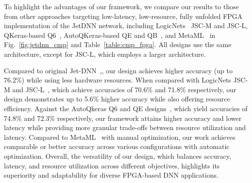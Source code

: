 
 
To highlight the advantages of our framework, we compare our results to those from other approaches targeting low-latency, low-resource, fully unfolded FPGA implementation of the JetDNN network, including LogicNets~\cite{umuroglu2020logicnets} JSC-M and JSC-L, QKeras-based Q6~\cite{coelho2021automatic}, AutoQKeras-based QE and QB~\cite{coelho2021automatic}, 
and MetaML~\cite{que2023metaml} in Fig.~\ref{fig:jetdnn_cmp} and Table~\ref{table:cmp_fpga}.
All designs use the same architecture, except for JSC-L, which employs a larger architecture. 

Compared to original Jet-DNN~\cite{duarte2018fast},, our design achieves higher accuracy (up to 76.2\%) while using less hardware resources. When compared with LogicNets JSC-M and JSC-L~\cite{umuroglu2020logicnets}, which achieve accuracies of 70.6\% and 71.8\% respectively, our design demonstrates up to 5.6\% higher accuracy while also offering resource efficiency. 
Against the AutoQkeras Q6 and QE designs~\cite{coelho2021automatic}, which yield accuracies of 74.8\% and 72.3\% respectively, our framework attains higher accuracy and lower latency while providing more granular trade-offs between resource utilization and latency. 
Compared to MetaML~\cite{que2023metaml} with manual optimization, our work achieves comparable or better accuracy across various configurations with automatic optimization. 
Overall, the versatility of our design, which balances accuracy, latency, and resource utilization across different objectives, highlights its superiority and adaptability for diverse FPGA-based DNN applications.

